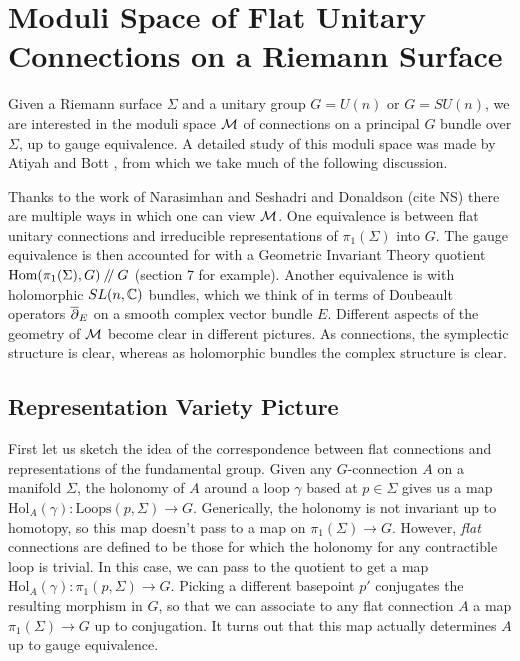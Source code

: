 \section{Moduli Space of Flat Unitary Connections on a Riemann Surface}
\label{s:vectorbundles}
	Given a Riemann surface $\Sigma$ and a unitary group $G=U(n)$ or $G=SU(n)$, we are interested in the moduli space $\mathcal{M}$ of connections on a principal $G$ bundle over $\Sigma$, up to gauge equivalence. A detailed study of this moduli space was made by Atiyah and Bott \cite{atiyah_yang-mills_1983}, from which we take much of the following discussion.
	
	Thanks to the work of Narasimhan and Seshadri and Donaldson \cite{donaldson_new_1983}(cite NS) there are multiple ways in which one can view $\mathcal{M}$. One equivalence is between flat unitary connections and irreducible representations of $\pi_1(\Sigma)$ into $G$. The gauge equivalence is then accounted for with a Geometric Invariant Theory quotient $\text{Hom}(\pi_1(\Sigma), G)\mathbin{/\mkern-4mu/} G$ \cite{thaddeus_geometric_1996}(section 7 for example). Another equivalence is with holomorphic $SL(n,\mathbb{C})$ bundles, which we think of in terms of Doubeault operators $\overline{\partial}_E$ on a smooth complex vector bundle $E$. Different aspects of the geometry of $\mathcal{M}$ become clear in different pictures. As connections, the symplectic structure is clear, whereas as holomorphic bundles the complex structure is clear.
	\subsection{Representation Variety Picture}
	First let us sketch the idea of the correspondence between flat connections and representations of the fundamental group. Given any $G$-connection $A$ on a manifold $\Sigma$, the holonomy of $A$ around a loop $\gamma$ based at $p\in \Sigma$ gives us a map $\text{Hol}_A(\gamma):\text{Loops}(p,\Sigma)\to G$. Generically, the holonomy is not invariant up to homotopy, so this map doesn't pass to a map on $\pi_1(\Sigma) \to G$. However, \emph{flat} connections are defined to be those for which the holonomy for any contractible loop is trivial. In this case, we can pass to the quotient to get a map $\text{Hol}_A(\gamma):\pi_1(p,\Sigma)\to G$. Picking a different basepoint $p'$ conjugates the resulting morphism in $G$, so that we can associate to any flat connection $A$ a map $\pi_1(\Sigma)\to G$ up to conjugation. It turns out that this map actually determines $A$ up to gauge equivalence.
	
